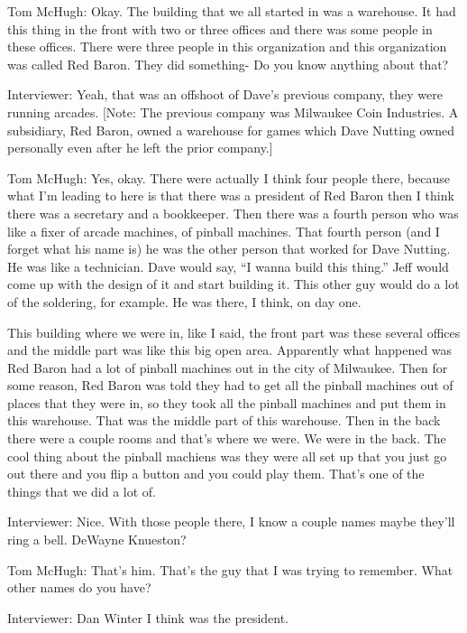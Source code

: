 \textcolor{interviewee}{Tom McHugh:} Okay. The building that we all started in was a warehouse. It had this thing in the front with two or three offices and there was some people in these offices. There were three people in this organization and this organization was called Red Baron. They did something- Do you know anything about that?

\textcolor{interviewer}{Interviewer:} Yeah, that was an offshoot of Dave’s previous company, they were running arcades. [Note: The previous company was Milwaukee Coin Industries. A subsidiary, Red Baron, owned a warehouse for games which Dave Nutting owned personally even after he left the prior company.]

\textcolor{interviewee}{Tom McHugh:} Yes, okay. There were actually I think four people there, because what I’m leading to here is that there was a president of Red Baron then I think there was a secretary and a bookkeeper. Then there was a fourth person who was like a fixer of arcade machines, of pinball machines. That fourth person (and I forget what his name is) he was the other person that worked for Dave Nutting. He was like a technician. Dave would say, “I wanna build this thing.” Jeff would come up with the design of it and start building it. This other guy would do a lot of the soldering, for example. He was there, I think, on day one.

This building where we were in, like I said, the front part was these several offices and the middle part was like this big open area. Apparently what happened was Red Baron had a lot of pinball machines out in the city of Milwaukee. Then for some reason, Red Baron was told they had to get all the pinball machines out of places that they were in, so they took all the pinball machines and put them in this warehouse. That was the middle part of this warehouse. Then in the back there were a couple rooms and that’s where we were. We were in the back. The cool thing about the pinball machiens was they were all set up that you just go out there and you flip a button and you could play them. That’s one of the things that we did a lot of.

\textcolor{interviewer}{Interviewer:} Nice. With those people there, I know a couple names maybe they’ll ring a bell. DeWayne Knueston?

\textcolor{interviewee}{Tom McHugh:} That’s him. That’s the guy that I was trying to remember. What other names do you have?

\textcolor{interviewer}{Interviewer:} Dan Winter I think was the president.

